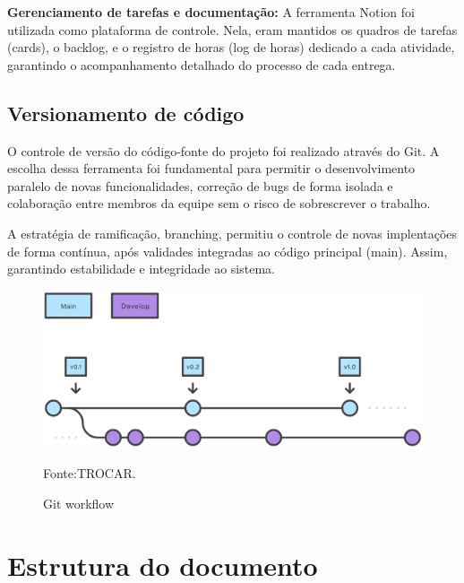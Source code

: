 \textbf{Gerenciamento de tarefas e documentação:} A ferramenta Notion foi utilizada como plataforma de controle. Nela, eram mantidos os quadros de tarefas (cards), o backlog, e o registro de horas (log de horas) dedicado a cada atividade, garantindo o acompanhamento detalhado do processo de cada entrega.

\subsection{Versionamento de código}

O controle de versão do código-fonte do projeto foi realizado através do Git. A escolha dessa ferramenta foi fundamental para permitir o desenvolvimento paralelo de novas funcionalidades, correção de bugs de forma isolada e colaboração entre membros da equipe sem o risco de sobrescrever o trabalho.

A estratégia de ramificação, branching, permitiu o controle de novas implentações de forma contínua, após validades integradas ao código principal (main). Assim, garantindo estabilidade e integridade ao sistema.

\begin{figure}[H]
  \centering
  \caption{Git workflow}\label{fig:git_workflow}
  \includegraphics[width=.6\linewidth]{imagens/gitflow.png}
  \par
  \footnotesize{Fonte:TROCAR.}
\end{figure}

\section{Estrutura do documento}

